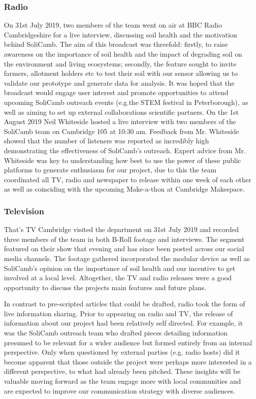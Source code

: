    
        
 \subsubsection{Radio}
         On 31st July 2019, two members of the team went on air at BBC Radio Cambridgeshire for a live interview, discussing soil health and the motivation behind SoliCamb. The aim of this broadcast was threefold: firstly, to raise awareness on the importance of soil health and the impact of degrading soil on the environment and living ecosystems; secondly, the feature sought to invite farmers, allotment holders etc to test their soil with our sensor allowing us to validate our prototype and generate data for analysis. It was hoped that the broadcast would engage user interest and promote opportunities to attend upcoming SoliCamb outreach events (e.g.the STEM festival in Peterborough), as well as aiming to set up external collaborations scientific partners. On the 1st August 2019 Neil Whiteside hosted a live interview with two members of the SoliCamb team on Cambridge 105 at 10:30 am. Feedback from Mr. Whiteside showed that the number of listeners was reported as incredibly high demonstrating the effectiveness of SoliCamb's outreach. Expert advice from Mr. Whiteside was key to understanding how best to use the power of these public platforms to generate enthusiasm for our project, due to this the team coordinated all TV, radio and newspaper to release within one week of each other as well as coinciding with the upcoming Make-a-thon at Cambridge Makespace. \\
 \subsubsection{Television}
 
         That's TV Cambridge visited the department on 31st July 2019 and recorded three members of the team in both B-Roll footage and interviews. The segment featured on their show that evening and has since been posted across our social media channels. The footage gathered incorporated the modular device as well as SoliCamb's opinion on the importance of soil health and our incentive to get involved at a local level.  Altogether, the TV and radio releases were a good opportunity to discuss the projects main features and future plans.\par 
         
In contrast to pre-scripted articles that could be drafted, radio took the form of live  information sharing. Prior to appearing on radio and TV, the release of information about our project had been relatively self directed. For example, it was the SoliCamb outreach team who drafted pieces detailing information presumed to be relevant for a wider audience but formed entirely from an internal perspective. Only when questioned by external parties (e.g. radio hosts) did it become apparent that those outside the project were perhaps more interested in a different perspective, to what had already been pitched. These insights will be valuable moving forward as the team engage more with local communities and are expected to improve our communication strategy with diverse audiences.
         
